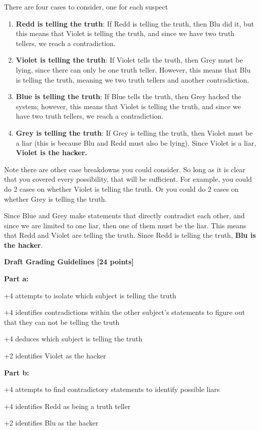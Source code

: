 \documentclass[12pt]{exam}
\begin{document}
\begin{solution}
\begin{qparts}
    \item There are four cases to consider, one for each suspect
    \begin{enumerate}[label={(\arabic*)}]
        \item \textbf{Redd is telling the truth}: If Redd is telling the truth, then Blu did it, but this means that Violet is telling the truth, and since we have two truth tellers, we reach a contradiction.
        \item \textbf{Violet is telling the truth}: If Violet tells the truth, then Grey must be lying, since there can only be one truth teller. However, this means that Blu is telling the truth, meaning we two truth tellers and another contradiction.
        \item \textbf{Blue is telling the truth}: If Blue tells the truth, then Grey hacked the system; however, this means that Violet is telling the truth, and since we have two truth tellers, we reach a contradiction.
        \item \textbf{Grey is telling the truth}: If Grey is telling the truth, then Violet must be a liar (this is because Blu and Redd must also be lying). Since Violet is a liar, \textbf{Violet is the hacker.}
    \end{enumerate}
    Note there are other case breakdowns you could consider.  So long as it is clear that you covered every possibility, that will be sufficient.  For example, you could do 2 cases on whether Violet is telling the truth.  Or you could do 2 cases on whether Grey is telling the truth.
    \item Since Blue and Grey make statements that directly contradict each other, and since we are limited to one liar, then one of them must be the liar. This means that Redd and Violet are telling the truth. Since Redd is telling the truth, \textbf{Blu is the hacker}.
\end{qparts}

\smallskip
\textbf{Draft Grading Guidelines [24 points]}

\textbf{Part a:}
\begin{gwguidelines}
    \item +4 attempts to isolate which subject is telling the truth
    \item +4 identifies contradictions within the other subject's statements to figure out that they can not be telling the truth
    \item +4 deduces which subject is telling the truth
    \item +2 identifies Violet as the hacker
\end{gwguidelines}
\textbf{Part b:}
\begin{gwguidelines}[resume]
    \item +4 attempts to find contradictory statements to identify possible liars
    \item +4 identifies Redd as being a truth teller
    \item +2 identifies Blu as the hacker
\end{gwguidelines}
\end{solution}
\end{document}
